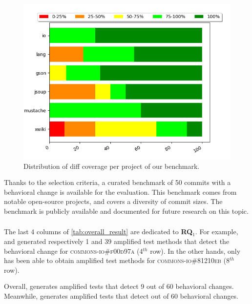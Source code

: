 \begin{figure}
\centering
\includegraphics[width=.95\linewidth]{img/diff_cov_hist.png}
\caption{Distribution of diff coverage per project of our benchmark.}
\label{fig:histdiffcoverage}
\end{figure}

Thanks to the selection criteria, 
a curated benchmark of 50 commits with a behavioral change is available for the evaluation.
This benchmark comes from notable open-source projects, and covers a diversity of commit sizes. 
The benchmark is publicly available and documented for future research on this topic.

\subsubsection{\rqdetection}
\label{subsubsec:dci:evaluation:rq1}

The last 4 columns of \autoref{tab:overall_result} are dedicated to \textbf{RQ$_1$}.
For example, \DCIA and \DCII generated respectively 1 and 39 amplified test methods that detect the behavioral change for \textsc{commons-io\#f00d97a} (4$^{th}$ row).
In the other hands, only \DCII has been able to obtain amplified test methods for \textsc{commons-io\#81210eb} (8$^{th}$ row).

Overall, \DCIA generates amplified tests that detect 9 out of 60 behavioral changes.
Meanwhile, \DCII generates amplified tests that detect  out of 60 behavioral changes.

